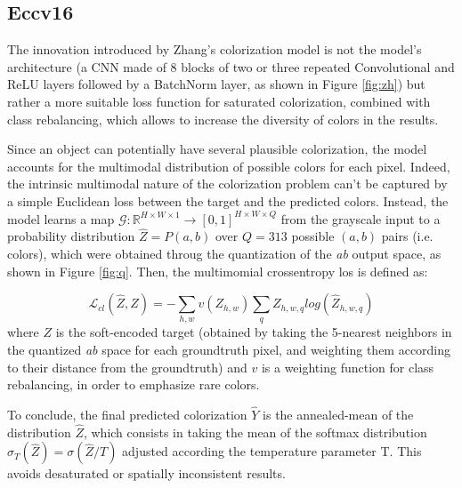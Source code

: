 \subsection{Eccv16}
The innovation introduced by Zhang's colorization model is not the model's architecture (a CNN made of 8 blocks of
two or three repeated Convolutional and ReLU layers followed by a BatchNorm layer, as shown in Figure \ref{fig:zh}) but rather a more suitable loss function for saturated colorization, combined with class rebalancing, which allows to increase the diversity of colors in the results.

Since an object can potentially have several plausible colorization, the model accounts for the multimodal
distribution of possible colors for each pixel. Indeed, the intrinsic multimodal nature of the colorization
problem can't be captured by a simple Euclidean loss between the target and the predicted colors. Instead, the
model learns a map $\mathcal{G}: \mathbb{R}^{H\times W\times1}\rightarrow [0,1]^{H\times W\times Q}$ from the grayscale input to a probability
distribution $\hat{Z}=P(a,b)$ over $Q=313$ possible $(a,b)$ pairs (i.e. colors), which were obtained throug the
quantization of the \textit{ab} output space, as shown in Figure \ref{fig:q}. Then, the multimomial crossentropy
los is defined as:

\begin{equation*}
	\mathcal{L}_{cl} (\hat{Z},Z)= - \sum_{h,w} v(Z_{h,w})\sum_q Z_{h,w,q}log(\hat{Z}_{h,w,q})
\end{equation*}
where $Z$ is the soft-encoded target (obtained by taking the 5-nearest neighbors in the quantized \textit{ab} space
for each groundtruth pixel, and weighting them according to their distance from the groundtruth) and $v$ is a
weighting function for class rebalancing, in order to emphasize rare colors.

To conclude, the final predicted colorization $\hat{Y}$ is the annealed-mean of the distribution $\hat{Z}$, which
consists in taking the mean of the softmax distribution $\sigma_T(\hat{Z}) = \sigma(\hat{Z}/T)$ adjusted according the
temperature parameter T. This avoids desaturated or spatially inconsistent results.